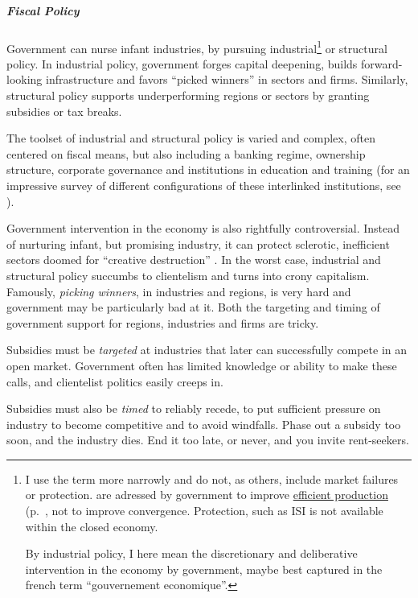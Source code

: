 \subparagraph{Fiscal Policy}
Government can nurse infant industries, by pursuing industrial\footnote{
	I use the term more narrowly and do not, as others, include market failures or protection.  are adressed by government to improve \hyperref[sec:production]{efficient production} (p.~\pageref{sec:production}, not to improve convergence. Protection, such as \gls{ISI} is not available within the closed economy.
	
	By industrial policy, I here mean the discretionary and deliberative intervention in the economy by government, maybe best captured in the french term ``gouvernement economique''.} 
or structural policy. In industrial policy, government forges capital deepening, builds forward-looking infrastructure and favors ``picked winners'' in sectors and firms. Similarly, structural policy supports underperforming regions or sectors by granting subsidies or tax breaks. 

The toolset of industrial and structural policy is varied and complex, often centered on fiscal means, but also including a banking regime, ownership structure, corporate governance and institutions in education and training (for an impressive survey of different configurations of these interlinked institutions, see \citealt{HallSoskice-2001-aa}). 

Government intervention in the economy is also rightfully controversial. Instead of nurturing infant, but promising industry, it can protect sclerotic, inefficient sectors doomed for ``creative destruction'' \citep{SchumpeterSwedberg-1942-aa}. In the worst case, industrial and structural policy succumbs to clientelism and turns into crony capitalism.  Famously, \emph{picking winners}, in industries and regions, is very hard and government may be particularly bad at it. Both the targeting and timing of government support for regions, industries and firms are tricky. 
\begin{inparaenum} 
	\item Subsidies must be \emph{targeted} at industries that later can successfully compete in an open market. Government often has limited knowledge or ability to make these calls, and clientelist politics easily creeps in. 
	\item Subsidies must also be \emph{timed} to reliably recede, to put sufficient pressure on industry to become competitive and to avoid windfalls. Phase out a subsidy too soon, and the industry dies. End it too late, or never, and you invite rent-seekers. 
\end{inparaenum}

